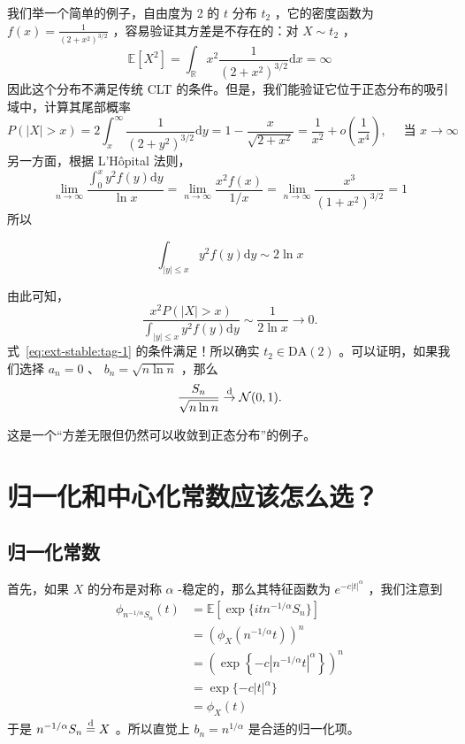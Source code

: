 \begin{example}[自由度为 2 的 $t$ 分布]
我们举一个简单的例子，自由度为 2 的 $t$ 分布 $t_2$ ，它的密度函数为 $f(x)=\frac1{(2+x^2)^{3/2}}$ ，容易验证其方差是不存在的：对 $X\sim t_2$ ，
\[\mathbb{E}[X^2]=\int_{\mathbb R}x^2\frac1{(2+x^2)^{3/2}}\mathrm{d}x=\infty\]
因此这个分布不满足传统 CLT 的条件。但是，我们能验证它位于正态分布的吸引域中，计算其尾部概率 \[ P(|X| > x) = 2 \int_x^\infty \frac{1}{(2+y^2)^{3/2}} \mathrm{d}y = 1 - \frac{x}{\sqrt{2+x^2}}=\frac1{x^2}+o\left(\frac1 {x^4}\right),\quad \text{ 当 }x\to\infty \]另一方面，根据 L'Hôpital 法则，
\[\lim_{n\to\infty}\frac{\int_0^x y^2f(y)\mathrm{d}y}{\ln x}=\lim_{n\to\infty}\frac{x^2f(x)}{1/x}=\lim_{n\to\infty}\frac{x^3}{(1+x^2)^{3/2}}=1\]
所以

\begin{equation}
\label{eq:ext-stable:tag-4}
\int_{|y|\le x}y^2f(y)\mathrm{d}y\sim 2\ln x
\end{equation}

由此可知，
\[
\frac{x^2P(|X|>x)}{\int_{|y|\le x}y^2f(y)\mathrm{d}y}\sim \frac{1}{2\ln x}\to 0.
\]
式~\eqref{eq:ext-stable:tag-1} 的条件满足！所以确实 $t_2\in\mathrm{DA}(2)$ 。可以证明，如果我们选择 $a_n=0$ 、 $b_n=\sqrt{n\ln n}$ ，那么
\[
\frac{S_n}{\sqrt{n\ln n}}\overset{\rm d}\to \mathcal N(0,1).
\]

这是一个``方差无限但仍然可以收敛到正态分布''的例子。


\end{example}

\section{归一化和中心化常数应该怎么选？}

\subsection{归一化常数}

首先，如果 $X$ 的分布是对称 $\alpha$ -稳定的，那么其特征函数为 $e^{-c|t|^\alpha}$ ，我们注意到
\[\begin{aligned} \phi_{n^{-1/\alpha}S_n}(t)&=\mathbb{E}[\exp \{itn^{-1/\alpha }S_n\}]\\ &=(\phi_X(n^{-1/\alpha }t))^n \\ &=\left(\exp\left\{-c|n^{-1/\alpha} t|^\alpha\right\}\right)^n\\ &=\exp\{-c|t|^\alpha\}\\ &=\phi_{X}(t) \end{aligned}\]
于是 $n^{-1/\alpha}S_n\overset{\rm d}=X$ 。所以直觉上 $b_n = n^{1/\alpha}$ 是合适的归一化项。

